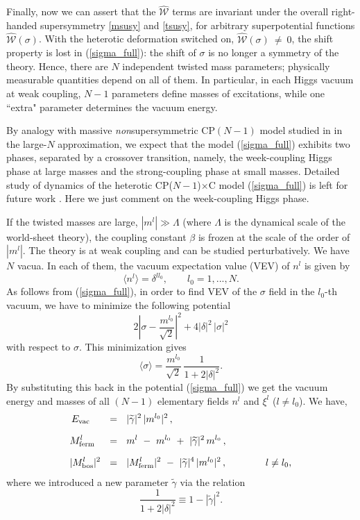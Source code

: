 \documentclass[12pt]{article}
\def\beq{\begin{equation}}
\def\eeq{\end{equation}}
\newcommand{\wt}{\widetilde}
\newcommand{\mc}[1]{\mathcal{#1}}
\newcommand{\CPC}{CP($N-1$)$\times$C }
\newcommand{\tgamma}{\wt{\gamma}}
\begin{document}
	Finally, now we can assert that the $ \hat{\mc{W}} $ terms are invariant under the overall
	right-handed supersymmetry \eqref{msusy} and \eqref{tsusy}, for  arbitrary 
	superpotential functions $ \hat{\mc{W}}(\sigma) $.
	With the heterotic deformation switched on, $ \hat{\mc{W}}(\sigma) ~\neq~ 0 $,
the shift property is lost in (\ref{sigma_full}):
the shift of $ \sigma $ is no longer a symmetry of the theory. Hence,
there are $ N $ independent twisted mass parameters; physically measurable
quantities depend on
 all of them. 
	In particular, in each Higgs vacuum at weak coupling, $ N - 1 $ parameters define masses of excitations, while one ``extra" parameter determines
	the vacuum energy.



By analogy with massive {\em non}supersymmetric CP$(N-1)$ model
studied in \cite{GSYphtr} in the large-$N$ approximation, we expect
that the model (\ref{sigma_full}) exhibits  two phases, 
separated by a crossover transition,
namely, the week-coupling Higgs phase at large masses and 
the strong-coupling phase at small masses. Detailed study of dynamics
of the heterotic \CPC model (\ref{sigma_full}) is left for future work
\cite{BSY5}. Here we just comment on the week-coupling Higgs phase.

If the twisted masses are large, $|m^l|\gg \Lambda$ (where $\Lambda$ is
the dynamical  scale of the world-sheet theory), the coupling constant
$\beta$ is frozen at the scale of the order of $|m^l|$.
The theory is at weak coupling   and can be studied
perturbatively. We have $N$ vacua. In   each of them,  the vacuum expectation value (VEV) of
$n^l$ is given by
\beq
\langle n^l \rangle =\delta^{ll_0}, \qquad l_0=1,...,N.
\label{higgsn}
\eeq
As follows from (\ref{sigma_full}), in order to find VEV of  the $\sigma$ 
field in the $l_0$-th vacuum, we have to minimize the following potential
\beq
2\left|\sigma -\frac{m^{l_0}}{\sqrt{2}}\right|^2 
+4|\delta|^2\,|\sigma|^2
\label{sigmapot}
\eeq
with respect to $\sigma$.
This minimization gives
\beq
\langle \sigma \rangle = \frac{m^{l_0}}{\sqrt{2}}\,
\frac{1}{1+2|\delta|^2}.
\label{higgssigma}
\eeq
By substituting this back in the potential (\ref{sigma_full})
we get the vacuum energy and masses of all $(N-1)$
elementary fields $n^l$ and $\xi^l$ ($l\neq l_0$). We have,
\begin{align}
%
\notag
	E_\text{vac}~~\;\, & ~~=~~ |\tgamma|^2\, |m^{l_0}|^2 \,,
	\\[2mm]
%
\label{hetmass}
	M_\text{ferm}^l\;\,\, & ~~=~~ m^l ~-~ m^{l_0} ~+~ |\tgamma|^2\,m^{l_0} \,,
	\\[2mm]
%
\notag
	| M_\text{bos}^l |^2 & ~~=~~ | M_\text{ferm}^l |^2 ~-~ |\tgamma|^4\, |m^{l_0}|^2\,,
	\qquad\qquad
	l\neq l_0,
\end{align}
where we introduced a new parameter $\tgamma$ via the relation
\beq
\frac{1}{1+2|\delta|^2}\equiv 1-|\tgamma|^2.
\label{gammadelta}
\eeq
\end{document}
